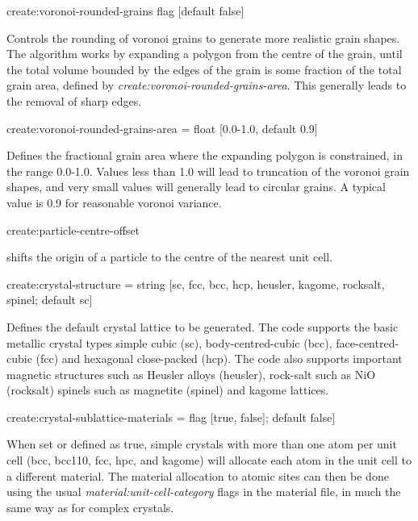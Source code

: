 {\zicf create:voronoi-rounded-grains flag [default false]} Controls the rounding of voronoi grains to generate more realistic grain shapes. The algorithm works by expanding a polygon from the centre of the grain, until the total volume bounded by the edges of the grain is some fraction of the total grain area, defined by \textit{create:voronoi-rounded-grains-area}. This generally leads to the removal of sharp edges. \\ \par

{\zicf create:voronoi-rounded-grains-area = float [0.0-1.0, default 0.9]} Defines the fractional grain area where the expanding polygon is constrained, in the range 0.0-1.0. Values less than 1.0 will lead to truncation of the voronoi grain shapes, and very small values will generally lead to circular grains. A typical value is 0.9 for reasonable voronoi variance.\\ \par

{\zicf create:particle-centre-offset} shifts the origin of a particle to the centre of the nearest unit cell.\\ \par

{\zicf create:crystal-structure = string [sc, fcc, bcc, hcp, heusler, kagome, rocksalt, spinel; default sc]}
Defines the default crystal lattice to be generated. The code supports the basic
 metallic crystal types simple cubic (sc), body-centred-cubic (bcc),
 face-centred-cubic (fcc) and hexagonal close-packed (hcp). The code also
 supports important magnetic structures such as Heusler alloys (heusler),
 rock-salt such as NiO (rocksalt) spinels such as magnetite (spinel) and kagome
 lattices. \\ \par

{\zicf create:crystal-sublattice-materials = flag [true, false]; default false]}
When set or defined as true, simple crystals with more than one atom per unit
cell (bcc, bcc110, fcc, hpc, and kagome) will allocate each atom in the unit
cell to a different material. The material allocation to atomic sites can then
be done using the usual \textit{material:unit-cell-category} flags in the
material file, in much the same way as for complex crystals. \\ \par


